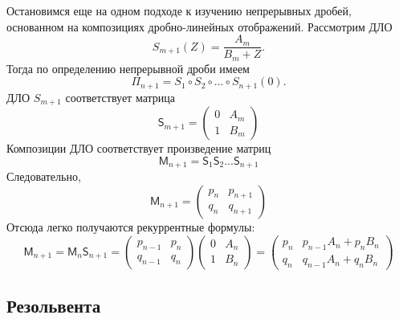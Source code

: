 \documentclass[12 pt, a4 paper]{article}
\theoremstyle{plain}   \newtheorem{Pro}{Задача}
\begin{document}
Остановимся еще на одном подходе к изучению непрерывных
дробей, основанном на композициях дробно-линейных отображений.
Рассмотрим ДЛО
$$
  S_{m+1}(Z)=\frac{A_m}{B_m +Z}.
$$
Тогда по определению непрерывной дроби имеем
$$
  \Pi _{n+1}= S_1 \circ S_2 \circ ... \circ S_{n+1} (0).
$$
ДЛО
$ S_{m+1} $
соответствует матрица
\begin{equation*}
  \mathsf{S}_{m+1}=
    \begin{pmatrix}
	  0 & A_m \\
	  1 & B_m
	\end{pmatrix}
\end{equation*}
Композиции ДЛО соответствует произведение матриц
$$
  \mathsf{M}_{n+1}=\mathsf{S}_1 \mathsf{S}_2 ...\mathsf{S}_{n+1}
$$
Следовательно,
\begin{equation*}
  \mathsf{M}_{n+1}=
    \begin{pmatrix}
	  p_n & p_{n+1}\\
	  q_n & q_{n+1}
	\end{pmatrix}
\end{equation*}
Отсюда легко получаются рекуррентные формулы:
\begin{equation*}
  \mathsf{M}_{n+1} =\mathsf{M}_n \mathsf{S}_{n+1}=
    \begin{pmatrix}
	  p_{n-1} & p_n \\
	  q_{n-1} & q_n
	\end{pmatrix}
	\begin{pmatrix}
	  0 & A_n \\
	  1 & B_n
	\end{pmatrix}
	=
	  \begin{pmatrix}
	    p_n & p_{n-1}A_n + p_n B_n \\
		q_n & q_{n-1}A_n + q_n B_n
	  \end{pmatrix}
\end{equation*}
\newpage
\subsection{Резольвента}
$ \; $
\\
\end{document}
